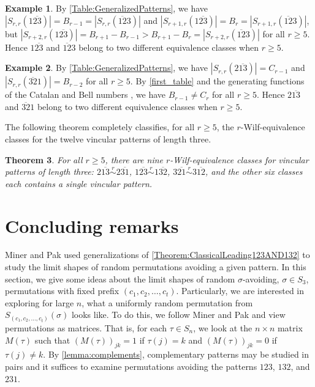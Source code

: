 \documentclass[11pt]{article}
\newtheorem{theorem}{Theorem}[section]
\theoremstyle{definition}
\newtheorem{example}[theorem]{Example}
\newcommand{\rsim}{\stackrel{r}{\sim}}
\numberwithin{equation}{section}
\begin{document}
\begin{example} By \cref{Table:GeneralizedPatterns}, we have $|S_{r,r}(1\overline{23})|=B_{r-1}=|S_{r,r}(\overline{12}3)|$ and $|S_{r+1,r}(1\overline{23})|=B_{r}=|S_{r+1,r}(\overline{12}3)|$, but $|S_{r+2,r}(1\overline{23})|=B_{r+1}-B_{r-1}>B_{r+1}-B_r=|S_{r+2,r}(\overline{12}3)|$ for all $r\geq5$. Hence $1\overline{23}$ and $\overline{12}3$ belong to two different equivalence classes when $r\geq5$.
\end{example}

\begin{example}
By \cref{Table:GeneralizedPatterns}, we have $|S_{r,r}(2\overline{13})|=C_{r-1}$ and $|S_{r,r}(\overline{32}1)|=B_{r-2}$ for all $r\geq5$. By \cref{first_table} and the generating functions of the Catalan and Bell numbers \cite[Sections 3.2 and 6.1]{EgeciogluGarsia2021}, we have $B_{r-1}\neq C_r$ for all $r\geq5$. Hence $2\overline{13}$ and $\overline{32}1$ belong to two different equivalence classes when $r\geq5$.
\end{example}

The following theorem completely classifies, for all $r\geq5$, the
$r$-Wilf-equivalence classes for the twelve vincular patterns of length three.
\begin{theorem}
    For all $r\geq5$, there are nine $r$-Wilf-equivalence classes for 
vincular patterns of length three: 
$2\overline{13}\rsim 2\overline{31}$, $1\overline{23}\rsim1\overline{32}$, $3\overline{21}\rsim 3\overline{12}$, and the other six classes each contains a single vincular pattern.
\end{theorem}


\section{Concluding remarks}\label{Section:Concluding}
Miner and Pak \cite{MinerPak2014} used generalizations of \cref{Theorem:ClassicalLeading123AND132} to study the limit shapes of random permutations avoiding a given pattern. In this section, we give some ideas about the limit shapes of random $\sigma$-avoiding, $\sigma\in S_3$, permutations with 
fixed prefix $(c_1,c_2,\ldots,c_t)$. Particularly, we are interested in exploring for large $n$, what a uniformly random permutation from $S_{(c_1,c_2,\ldots,c_t)}(\sigma)$ looks like. To do this, we follow Miner and Pak \cite{MinerPak2014} and 
view permutations as matrices. That is, for each $\tau\in S_n$, we look at the $n\times n$ matrix $M(\tau)$ such that $(M(\tau))_{jk}=1$ if $\tau(j)=k$ and $(M(\tau))_{jk}=0$ if $\tau(j)\neq k$. By \cref{lemma:complements}, complementary patterns may be studied in pairs and it suffices to examine permutations avoiding the patterns $123$, $132$, and $231$.
\end{document}
